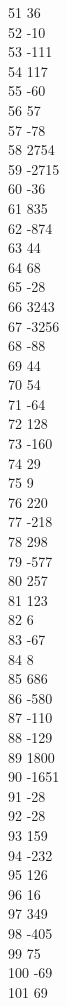 { 51	36 \\
 52	-10 \\
 53	-111 \\
 54	117 \\
 55	-60 \\
 56	57 \\
 57	-78 \\
 58	2754 \\
 59	-2715 \\
 60	-36 \\
 61	835 \\
 62	-874 \\
 63	44 \\
 64	68 \\
 65	-28 \\
 66	3243 \\
 67	-3256 \\
 68	-88 \\
 69	44 \\
 70	54 \\
 71	-64 \\
 72	128 \\
 73	-160 \\
 74	29 \\
 75	9 \\
 76	220 \\
 77	-218 \\
 78	298 \\
 79	-577 \\
 80	257 \\
 81	123 \\
 82	6 \\
 83	-67 \\
 84	8 \\
 85	686 \\
 86	-580 \\
 87	-110 \\
 88	-129 \\
 89	1800 \\
 90	-1651 \\
 91	-28 \\
 92	-28 \\
 93	159 \\
 94	-232 \\
 95	126 \\
 96	16 \\
 97	349 \\
 98	-405 \\
 99	75 \\
 100	-69 \\
 101	69 \\
}
